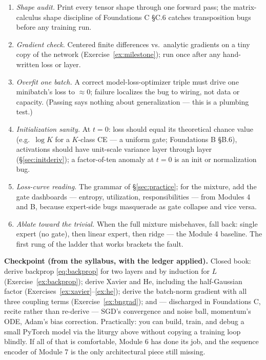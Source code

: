 \documentclass[11pt]{article}
\numberwithin{equation}{section}
\theoremstyle{plain}
\theoremstyle{definition}
\theoremstyle{remark}
\begin{document}
\begin{enumerate}[leftmargin=2em,itemsep=0.15em]
\item \emph{Shape audit.} Print every tensor shape through one forward pass; the matrix-calculus shape discipline of Foundations C \S C.6 catches transposition bugs before any training run.
\item \emph{Gradient check.} Centered finite differences vs.\ analytic gradients on a tiny copy of the network (Exercise~\ref{ex:milestone}); run once after any hand-written loss or layer.
\item \emph{Overfit one batch.} A correct model-loss-optimizer triple must drive one minibatch's loss to $\approx 0$; failure localizes the bug to wiring, not data or capacity. (Passing says nothing about generalization --- this is a plumbing test.)
\item \emph{Initialization sanity.} At $t = 0$: loss should equal its theoretical chance value (e.g.\ $\log K$ for a $K$-class CE --- a uniform gate; Foundations B \S B.6), activations should have unit-scale variance layer through layer (\S\ref{sec:initderiv}); a factor-of-ten anomaly at $t=0$ is an init or normalization bug.
\item \emph{Loss-curve reading.} The grammar of \S\ref{sec:practice}; for the mixture, add the gate dashboards --- entropy, utilization, responsibilities --- from Modules 4 and B, because expert-side bugs masquerade as gate collapse and vice versa.
\item \emph{Ablate toward the trivial.} When the full mixture misbehaves, fall back: single expert (no gate), then linear expert, then ridge --- the Module 4 baseline. The first rung of the ladder that works brackets the fault.
\end{enumerate}

\medskip
\noindent\textbf{Checkpoint (from the syllabus, with the ledger applied).} Closed book: derive backprop \eqref{eq:backprop} for two layers and by induction for $L$ (Exercise~\ref{ex:backprop}); derive Xavier and He, including the half-Gaussian factor (Exercises~\ref{ex:xavier}--\ref{ex:he}); derive the batch-norm gradient with all three coupling terms (Exercise~\ref{ex:bngrad}); and --- discharged in Foundations C, recite rather than re-derive --- SGD's convergence and noise ball, momentum's ODE, Adam's bias correction. Practically: you can build, train, and debug a small PyTorch model via the liturgy above without copying a training loop blindly. If all of that is comfortable, Module 6 has done its job, and the sequence encoder of Module 7 is the only architectural piece still missing.
\end{document}
